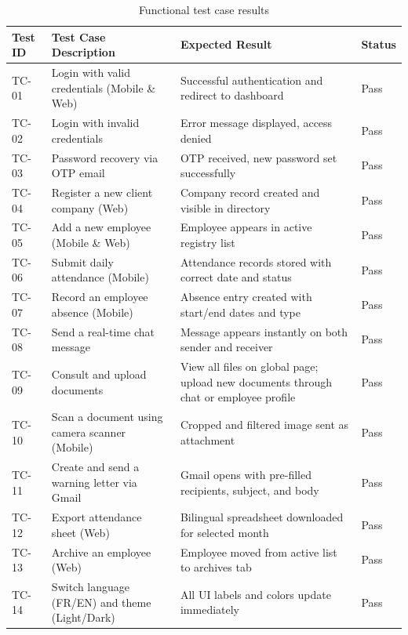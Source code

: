 \begin{table}[H]
\centering
\caption{Functional test case results}
\label{tab:test_cases}
\begin{tabular}{|l|p{6cm}|p{6cm}|l|}
\hline
\textbf{Test ID} & \textbf{Test Case Description} & \textbf{Expected Result} & \textbf{Status} \\
\hline
TC-01 & Login with valid credentials (Mobile \& Web) & Successful authentication and redirect to dashboard & Pass \\
\hline
TC-02 & Login with invalid credentials & Error message displayed, access denied & Pass \\
\hline
TC-03 & Password recovery via OTP email & OTP received, new password set successfully & Pass \\
\hline
TC-04 & Register a new client company (Web) & Company record created and visible in directory & Pass \\
\hline
TC-05 & Add a new employee (Mobile \& Web) & Employee appears in active registry list & Pass \\
\hline
TC-06 & Submit daily attendance (Mobile) & Attendance records stored with correct date and status & Pass \\
\hline
TC-07 & Record an employee absence (Mobile) & Absence entry created with start/end dates and type & Pass \\
\hline
TC-08 & Send a real-time chat message & Message appears instantly on both sender and receiver & Pass \\
\hline
TC-09 & Consult and upload documents & View all files on global page; upload new documents through chat or employee profile & Pass \\
\hline
TC-10 & Scan a document using camera scanner (Mobile) & Cropped and filtered image sent as attachment & Pass \\
\hline
TC-11 & Create and send a warning letter via Gmail & Gmail opens with pre-filled recipients, subject, and body & Pass \\
\hline
TC-12 & Export attendance sheet (Web) & Bilingual spreadsheet downloaded for selected month & Pass \\
\hline
TC-13 & Archive an employee (Web) & Employee moved from active list to archives tab & Pass \\
\hline
TC-14 & Switch language (FR/EN) and theme (Light/Dark) & All UI labels and colors update immediately & Pass \\
\hline
\end{tabular}
\end{table}

